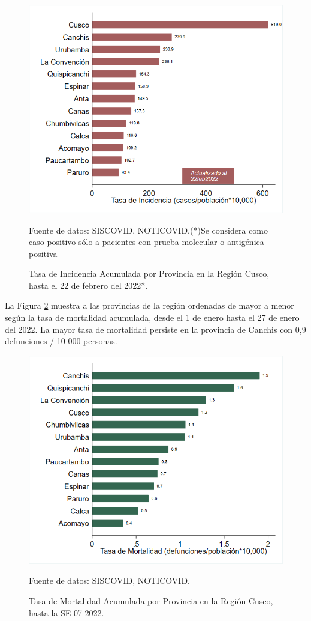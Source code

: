 \documentclass[12pt,a4paper,openany]{book}
\begin{document}
\begin{figure}[!htpb]
	\caption{Tasa de Incidencia Acumulada por Provincia en la Región Cusco, hasta el 22 de febrero del 2022*. }\label{fig:incidencia_provincias}
	\begin{center}
		\includegraphics[width=0.75\linewidth]{../figuras/incidencia_provincial_2022.png}
	\end{center}
	{\footnotesize {
	Fuente de datos: SISCOVID, NOTICOVID.(*)Se considera como caso positivo sólo a pacientes con prueba molecular o antigénica positiva}}
\end{figure}


La Figura \ref{fig:mortalidad_ordenada} muestra a las provincias de la región ordenadas de mayor a menor según la tasa de mortalidad acumulada, desde el 1 de enero hasta el 27 de enero del 2022. La mayor tasa de mortalidad persiste en la provincia de Canchis con 0,9 defunciones / 10 000 personas.   

\begin{figure}[h]
	\caption{Tasa de Mortalidad Acumulada por Provincia en la Región Cusco, hasta la SE 07-2022. }\label{fig:mortalidad_ordenada}
	\begin{center}
		\includegraphics[width=0.65\linewidth]{../figuras/mortalidad_provincial_2022.png}
	\end{center}
	{\footnotesize {Fuente de datos: SISCOVID, NOTICOVID.}}
\end{figure}
\end{document}
